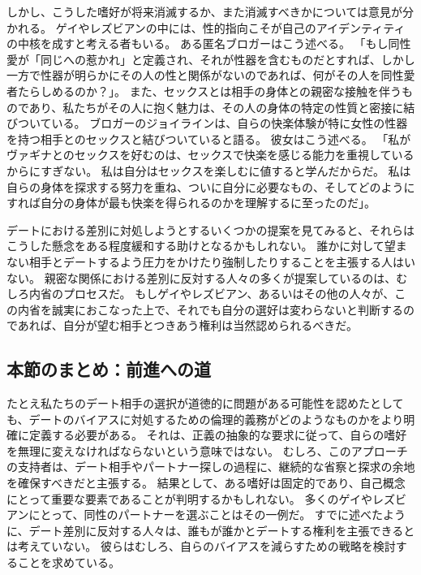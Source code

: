 \documentclass[paper=a4,book,openany]{jlreq}
\begin{document}
しかし、こうした嗜好が将来消滅するか、また消滅すべきかについては意見が分かれる。
ゲイやレズビアンの中には、性的指向こそが自己のアイデンティティの中核を成すと考える者もいる。
ある匿名ブロガーはこう述べる。
「もし同性愛が「同じへの惹かれ」と定義され、それが性器を含むものだとすれば、しかし一方で性器が明らかにその人の性と関係がないのであれば、何がその人を同性愛者たらしめるのか？」\citep{soldier17:_no_havin_genit}。
また、セックスとは相手の身体との親密な接触を伴うものであり、私たちがその人に抱く魅力は、その人の身体の特定の性質と密接に結びついている。
ブロガーのジョイラインは、自らの快楽体験が特に女性の性器を持つ相手とのセックスと結びついていると語る。
彼女はこう述べる。
「私がヴァギナとのセックスを好むのは、セックスで快楽を感じる能力を重視しているからにすぎない。
私は自分はセックスを楽しむに値すると学んだからだ。
私は自らの身体を探求する努力を重ね、ついに自分に必要なもの、そしてどのようにすれば自分の身体が最も快楽を得られるのかを理解するに至ったのだ」\citep{maenzanise19:_i_dont_find_piv_sex}。

デートにおける差別に対処しようとするいくつかの提案を見てみると、それらはこうした懸念をある程度緩和する助けとなるかもしれない。
誰かに対して望まない相手とデートするよう圧力をかけたり強制したりすることを主張する人はいない。
親密な関係における差別に反対する人々の多くが提案しているのは、むしろ内省のプロセスだ。
もしゲイやレズビアン、あるいはその他の人々が、この内省を誠実におこなった上で、それでも自分の選好は変わらないと判断するのであれば、自分が望む相手とつきあう権利は当然認められるべきだ。

\subsection{本節のまとめ：前進への道}

たとえ私たちのデート相手の選択が道徳的に問題がある可能性を認めたとしても、デートのバイアスに対処するための倫理的義務がどのようなものかをより明確に定義する必要がある。
それは、正義の抽象的な要求に従って、自らの嗜好を無理に変えなければならないという意味ではない。
むしろ、このアプローチの支持者は、デート相手やパートナー探しの過程に、継続的な省察と探求の余地を確保すべきだと主張する。
結果として、ある嗜好は固定的であり、自己概念にとって重要な要素であることが判明するかもしれない。
多くのゲイやレズビアンにとって、同性のパートナーを選ぶことはその一例だ。
すでに述べたように、デート差別に反対する人々は、誰もが誰かとデートする権利を主張できるとは考えていない。
彼らはむしろ、自らのバイアスを減らすための戦略を検討することを求めている。
\end{document}
